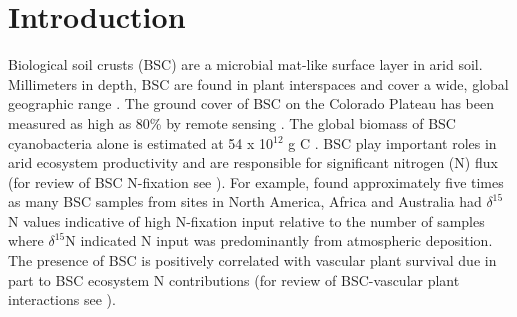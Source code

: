 \section{Introduction}


Biological soil crusts (BSC) are a microbial mat-like surface layer in arid
soil. Millimeters in depth, BSC are found in plant interspaces and cover a wide,
global geographic range \citep{garcia2003estimates}. The ground cover of BSC on
the Colorado Plateau has been measured as high as 80\% by remote sensing
\citep{karnieli2001}. The global biomass of BSC cyanobacteria alone is estimated
at 54 x 10$^{12}$ g C \citep{garcia2003estimates}. BSC play important roles in
arid ecosystem productivity and are responsible for significant nitrogen (N)
flux (for review of BSC N-fixation see \citet{belnap2003}). For example,
\citet{Evans_1999} found approximately five times as many BSC samples from
sites in North America, Africa and Australia had $\delta^{15}$N values
indicative of high N-fixation input relative to the number of samples where
$\delta^{15}$N indicated N input was predominantly from atmospheric deposition.
The presence of BSC is positively correlated with vascular plant
survival due in part to BSC ecosystem N contributions (for review of
BSC-vascular plant interactions see \citet{BelnapVascular}).

